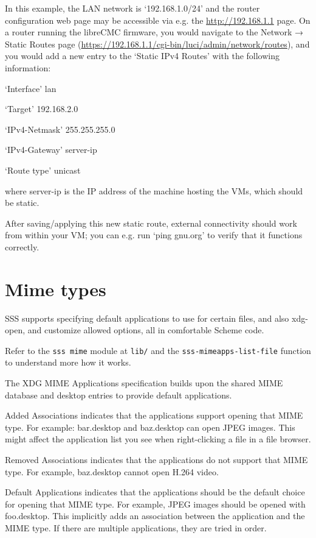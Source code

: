\documentclass[11pt]{article}
\begin{document}
In this example, the LAN network is ‘192.168.1.0/24’ and the router configuration web page may be accessible via e.g. the \url{http://192.168.1.1} page. On a router running the libreCMC firmware, you would navigate to the Network → Static Routes page (\url{https://192.168.1.1/cgi-bin/luci/admin/network/routes}), and you would add a new entry to the ‘Static IPv4 Routes’ with the following information:

‘Interface’
lan

‘Target’
192.168.2.0

‘IPv4-Netmask’
255.255.255.0

‘IPv4-Gateway’
server-ip

‘Route type’
unicast

where server-ip is the IP address of the machine hosting the VMs, which should be static.

After saving/applying this new static route, external connectivity should work from within your VM; you can e.g. run ‘ping gnu.org’ to verify that it functions correctly.

\section{Mime types}
\label{sec:orga0a660a}

SSS supports specifying default applications to use for certain files, and also xdg-open, and customize allowed options, all in comfortable Scheme code.

Refer to the \texttt{sss mime} module at \texttt{lib/} and the \texttt{sss-mimeapps-list-file} function to understand more how it works.

The XDG MIME Applications specification builds upon the shared MIME database and desktop entries to provide default applications.

Added Associations indicates that the applications support opening that MIME type.
For example:
bar.desktop and baz.desktop can open JPEG images.
This might affect the application list you see when right-clicking a file in a file browser.

Removed Associations indicates that the applications do not support that MIME type.
For example, baz.desktop cannot open H.264 video.

Default Applications indicates that the applications should be the default choice for opening that MIME type.
For example, JPEG images should be opened with foo.desktop. This implicitly adds an association between the application and the MIME type.
If there are multiple applications, they are tried in order.
\end{document}
